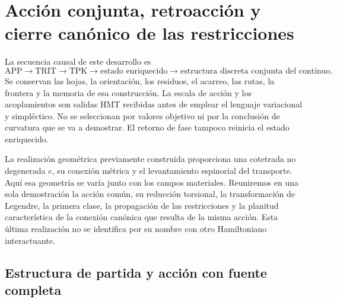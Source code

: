 \section{Acción conjunta, retroacción y cierre canónico de las restricciones}
\label{hmtcuatro:accion-retroaccion-restricciones}

La secuencia causal de este desarrollo es
\[
 \mathrm{APP}\longrightarrow\mathrm{TRIT}\longrightarrow\mathrm{TPK}
 \longrightarrow\text{estado enriquecido}
 \longrightarrow\text{estructura discreta conjunta del continuo}.
\]
Se conservan las hojas, la orientación, los residuos, el acarreo, las rutas,
la frontera y la memoria de esa construcción. La escala de acción y los
acoplamientos son salidas HMT recibidas antes de emplear el lenguaje
variacional y simpléctico. No se seleccionan por valores objetivo ni por
la conclusión de curvatura que se va a demostrar. El retorno de fase
tampoco reinicia el estado enriquecido.

La realización geométrica previamente construida proporciona una
cotetrada no degenerada \(e\), su conexión métrica y el levantamiento
espinorial del transporte. Aquí esa geometría se varía junto con los
campos materiales. Reuniremos en una sola demostración la acción común,
su reducción torsional, la transformación de Legendre, la primera clase,
la propagación de las restricciones y la planitud característica de la
conexión canónica que resulta de la misma acción. Esta última realización
no se identifica por su nombre con otro Hamiltoniano interactuante.

\subsection{Estructura de partida y acción con fuente completa}
\label{hmtcuatro:datos-accion-total}

